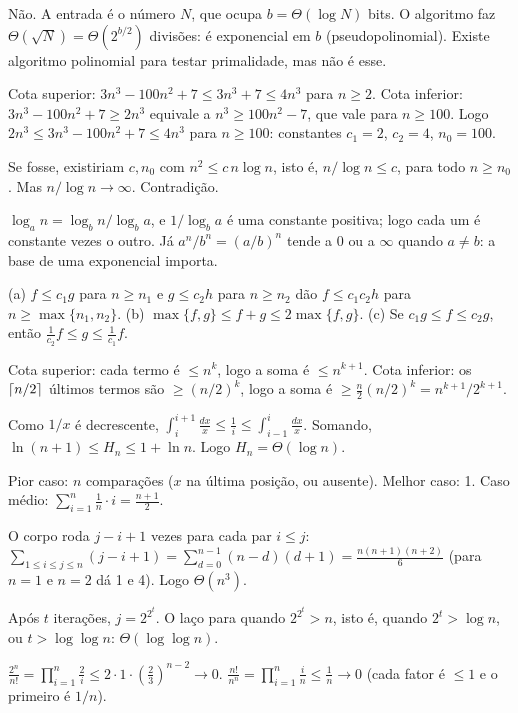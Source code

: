  Não. A entrada é o número $N$, que ocupa $b=\Theta(\log N)$ bits. O algoritmo faz $\Theta(\sqrt N)=\Theta(2^{b/2})$ divisões: é exponencial em $b$ (pseudopolinomial). Existe algoritmo polinomial para testar primalidade, mas não é esse.

 Cota superior: $3n^3-100n^2+7\le3n^3+7\le4n^3$ para $n\ge2$. Cota inferior: $3n^3-100n^2+7\ge2n^3$ equivale a $n^3\ge100n^2-7$, que vale para $n\ge100$. Logo $2n^3\le3n^3-100n^2+7\le4n^3$ para $n\ge100$: constantes $c_1=2$, $c_2=4$, $n_0=100$.

 Se fosse, existiriam $c,n_0$ com $n^2\le c\,n\log n$, isto é, $n/\log n\le c$, para todo $n\ge n_0$. Mas $n/\log n\to\infty$. Contradição.

 $\log_an=\log_bn/\log_ba$, e $1/\log_ba$ é uma constante positiva; logo cada um é constante vezes o outro. Já $a^n/b^n=(a/b)^n$ tende a 0 ou a $\infty$ quando $a\ne b$: a base de uma exponencial importa.

 (a) $f\le c_1g$ para $n\ge n_1$ e $g\le c_2h$ para $n\ge n_2$ dão $f\le c_1c_2h$ para $n\ge\max\{n_1,n_2\}$. (b) $\max\{f,g\}\le f+g\le2\max\{f,g\}$. (c) Se $c_1g\le f\le c_2g$, então $\frac1{c_2}f\le g\le\frac1{c_1}f$.

 Cota superior: cada termo é $\le n^k$, logo a soma é $\le n^{k+1}$. Cota inferior: os $\lceil n/2\rceil$ últimos termos são $\ge(n/2)^k$, logo a soma é $\ge\frac n2(n/2)^k=n^{k+1}/2^{k+1}$.

 Como $1/x$ é decrescente, $\int_i^{i+1}\frac{dx}x\le\frac1i\le\int_{i-1}^i\frac{dx}x$. Somando, $\ln(n+1)\le H_n\le1+\ln n$. Logo $H_n=\Theta(\log n)$.

 Pior caso: $n$ comparações ($x$ na última posição, ou ausente). Melhor caso: 1. Caso médio: $\sum_{i=1}^n\frac1n\cdot i=\frac{n+1}2$.

 O corpo roda $j-i+1$ vezes para cada par $i\le j$: $\sum_{1\le i\le j\le n}(j-i+1)=\sum_{d=0}^{n-1}(n-d)(d+1)=\frac{n(n+1)(n+2)}6$ (para $n=1$ e $n=2$ dá 1 e 4). Logo $\Theta(n^3)$.

 Após $t$ iterações, $j=2^{2^t}$. O laço para quando $2^{2^t}>n$, isto é, quando $2^t>\log n$, ou $t>\log\log n$: $\Theta(\log\log n)$.

 $\frac{2^n}{n!}=\prod_{i=1}^n\frac2i\le2\cdot1\cdot\left(\frac23\right)^{n-2}\to0$. $\frac{n!}{n^n}=\prod_{i=1}^n\frac in\le\frac1n\to0$ (cada fator é $\le1$ e o primeiro é $1/n$).

